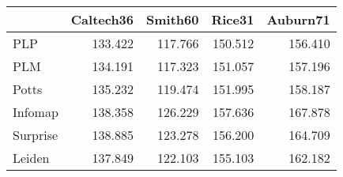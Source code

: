 \begin{tabular}{lrrrr}
\toprule
{} & Caltech36 & Smith60 &  Rice31 & Auburn71 \\
\midrule
PLP      &   133.422 & 117.766 & 150.512 &  156.410 \\
PLM      &   134.191 & 117.323 & 151.057 &  157.196 \\
Potts    &   135.232 & 119.474 & 151.995 &  158.187 \\
Infomap  &   138.358 & 126.229 & 157.636 &  167.878 \\
Surprise &   138.885 & 123.278 & 156.200 &  164.709 \\
Leiden   &   137.849 & 122.103 & 155.103 &  162.182 \\
\bottomrule
\end{tabular}
